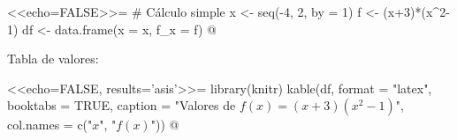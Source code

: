 \documentclass{article}
\begin{document}
	
	<<echo=FALSE>>=
	# Cálculo simple
	x <- seq(-4, 2, by = 1)
	f <- (x+3)*(x^2-1)
	df <- data.frame(x = x, f_x = f)
	@
	
	Tabla de valores:
	
	<<echo=FALSE, results='asis'>>=
	library(knitr)
	kable(df, format = "latex", booktabs = TRUE,
	caption = "Valores de $f(x)=(x+3)(x^2-1)$",
	col.names = c("$x$", "$f(x)$"))
	@
	
\end{document}
